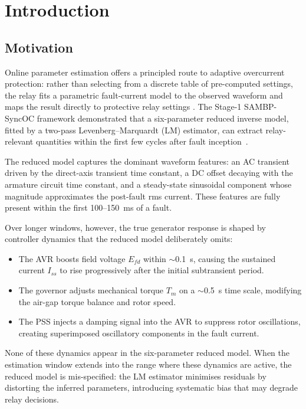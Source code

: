 \documentclass[journal,twoside,letterpaper]{IEEEtran}
\begin{document}
\section{Introduction}
\label{sec:intro}

\subsection{Motivation}

Online parameter estimation offers a principled route to
adaptive overcurrent protection: rather than selecting from a
discrete table of pre-computed settings, the relay fits a
parametric fault-current model to the observed waveform and
maps the result directly to protective relay settings
\cite{Eluvathingal2025_TR01,Lazkano2000}.
The Stage-1 SAMBP-SyncOC framework demonstrated that a
six-parameter reduced inverse model, fitted by a two-pass
Levenberg--Marquardt (LM) estimator, can extract relay-relevant
quantities within the first few cycles after fault
inception~\cite{Eluvathingal2025_TR01}.

The reduced model captures the dominant waveform features:
an AC transient driven by the direct-axis transient time
constant, a DC offset decaying with the armature circuit time
constant, and a steady-state sinusoidal component whose
magnitude approximates the post-fault rms current.
These features are fully present within the first 100--150~ms
of a fault.

Over longer windows, however, the true generator response is
shaped by controller dynamics that the reduced model
deliberately omits:
\begin{itemize}
  \item The AVR boosts field voltage $E_{fd}$ within
    $\sim$0.1~s, causing the sustained current $I_{ss}$ to
    rise progressively after the initial subtransient period.
  \item The governor adjusts mechanical torque $T_m$ on a
    $\sim$0.5~s time scale, modifying the air-gap torque
    balance and rotor speed.
  \item The PSS injects a damping signal into the AVR to
    suppress rotor oscillations, creating superimposed
    oscillatory components in the fault current.
\end{itemize}
None of these dynamics appear in the six-parameter reduced
model.
When the estimation window extends into the range where these
dynamics are active, the reduced model is mis-specified: the
LM estimator minimises residuals by distorting the inferred
parameters, introducing systematic bias that may degrade relay
decisions.
\end{document}
